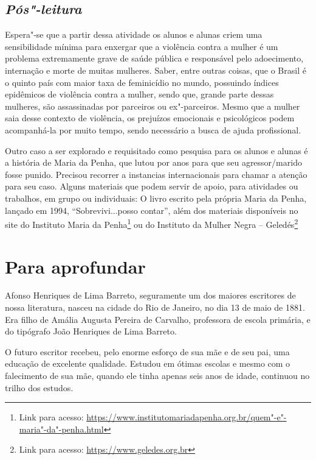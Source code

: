 \documentclass[11pt]{extarticle}
\begin{document}
{{\subsection{\textit{Pós"-leitura}}

Espera"-se que a partir dessa atividade os alunos e alunas criem uma
sensibilidade mínima para enxergar que a violência contra a mulher é um
problema extremamente grave de saúde pública e responsável pelo
adoecimento, internação e morte de muitas mulheres. Saber, entre outras
coisas, que o Brasil é o quinto país com maior taxa de feminicídio no
mundo, possuindo índices epidêmicos de violência contra a mulher, sendo
que, grande parte dessas mulheres, são assassinadas por parceiros ou
ex"-parceiros. Mesmo que a mulher saia desse contexto de violência, os
prejuízos emocionais e psicológicos podem acompanhá-la por muito tempo,
sendo necessário a busca de ajuda profissional.

Outro caso a ser explorado e requisitado como pesquisa para os alunos e
alunas é a história de Maria da Penha, que lutou por anos para que seu
agressor/marido fosse punido. Precisou recorrer a instancias
internacionais para chamar a atenção para seu caso. Alguns materiais que
podem servir de apoio, para atividades ou trabalhos, em grupo ou
individuais: O livro escrito pela própria Maria da Penha, lançado em
1994, ``Sobrevivi...posso contar'', além dos materiais disponíveis no
site do Instituto Maria da Penha\footnote{Link para acesso:
  \url{https://www.institutomariadapenha.org.br/quem"-e"-maria"-da"-penha.html}}
ou do Instituto da Mulher Negra -- Geledés\footnote{Link para acesso:
  \url{https://www.geledes.org.br}}
  





\section{Para aprofundar}

Afonso Henriques de Lima Barreto, seguramente um dos maiores escritores
de nossa literatura, nasceu na cidade do Rio de Janeiro, no dia 13 de
maio de 1881. Era filho de Amália Augusta Pereira de Carvalho,
professora de escola primária, e do tipógrafo João Henriques de Lima
Barreto.

O futuro escritor recebeu, pelo enorme esforço de sua mãe e de seu pai,
uma educação de excelente qualidade. Estudou em ótimas escolas e mesmo
com o falecimento de sua mãe, quando ele tinha apenas seis anos de
idade, continuou no trilho dos estudos.

}}
\end{document}
